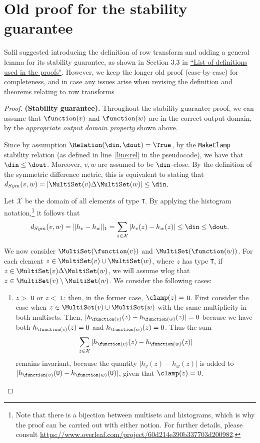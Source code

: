 \newpage

\section{Old proof for the stability guarantee}
Salil suggested introducing the definition of row transform and adding a general lemma for its stability guarantee, as shown in Section 3.3 in \href{https://www.overleaf.com/project/60d214e390b337703d200982}{``List of definitions used in the proofs"}. However, we keep the longer old proof (case-by-case) for completeness, and in case any issues arise when revising the definition and theorems relating to row transforms

\begin{proof}
\smallskip
\textbf{(Stability guarantee).} Throughout the stability guarantee proof, we can assume that $\function(v)$ and $\function(w)$ are in the correct output domain, by the \textit{appropriate output domain property} shown above. 

Since by assumption $\Relation(\din, \dout) = \True$, by the \texttt{MakeClamp} stability relation (as defined in line~\ref{line:rel} in the pseudocode), we have that $\din \leq \dout$. Moreover, $v, w$ are assumed to be $\din$-close. By the definition of the symmetric difference metric, this is equivalent to stating that $d_{Sym}(v, w) = |\MultiSet(v) \Delta \MultiSet(w)| \leq \din$.

Let $\mathcal{X}$ be the domain of all elements of type \texttt{T}. By applying the histogram notation,\footnote{Note that there is a bijection between multisets and histograms, which is why the proof can be carried out with either notion. For further details, please consult \url{https://www.overleaf.com/project/60d214e390b337703d200982}.}  it follows that
\[
d_{Sym}(v, w) = \lVert h_{v} - h_{w}\rVert_1 = \sum_{z \in \mathcal{X}} |h_v(z) - h_w(z)| \leq \din \leq \dout.
\]

We now consider $\MultiSet(\function(v))$ and $\MultiSet(\function(w))$.
For each element $z \in \MultiSet(v) \cup \MultiSet(w)$, where $z$ has type \texttt{T}, if $z \in \MultiSet(v) \Delta \MultiSet(w)$, we will assume wlog that $z \in \MultiSet(v) \setminus \MultiSet(w)$. We consider the following cases:

\begin{enumerate}
    \item $z >$ \texttt{U} or $z <$ \texttt{L}: then, in the former case, $\clamp(z) =$ \texttt{U}. First consider the case when $z \in \MultiSet(v) \cup \MultiSet(w)$ with the same multiplicity in both multisets. Then, $|h_{\function(v)}(z) - h_{\function(w)}(z)| = 0$ because we have both $h_{\function(v)}(z) = 0$ and $h_{\function(w)}(z) = 0$. Thus the sum
    \[
    \sum_{z \in \mathcal{X}} |h_{\function(v)}(z) - h_{\function(w)}(z)|
    \]
    remains invariant, because the quantity $|h_{v}(z) - h_{w}(z)|$ is added to $|h_{\function(v)}(\texttt{U}) - h_{\function(w)}(\texttt{U})|$, given that $\clamp(z) = \texttt{U}$. 
    

\end{enumerate}
\end{proof}
